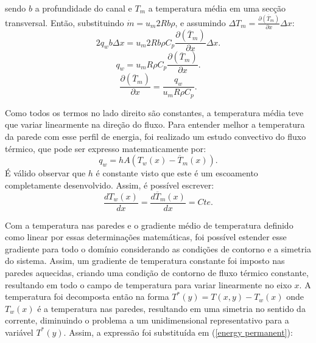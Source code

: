 sendo $b$ a profundidade do canal e $T_m$ a temperatura média em uma secção transversal. Então, substituindo $ \dot{m} = u_m 2R b \rho $, e assumindo $ \Delta T_m = \frac{\partial{\left(\overline{T}_m\right)}}{\partial{x}} \Delta x $:
\begin{equation}
2q_w b \Delta x = u_m 2R b \rho  C_p \frac{\partial{\left(\overline{T}_m\right)}}{\partial{x}} \Delta x.
\end{equation}     
\begin{equation}
q_w = u_m R \rho  C_p \frac{\partial{\left(\overline{T}_m\right)}}{\partial{x}} .
\end{equation} 
\begin{equation}\label{c_h_ee}
\frac{\partial{\left(\overline{T}_m\right)}}{\partial{x}} = \frac{q_w}{u_m  R \rho  C_p } .
\end{equation} 

Como todos os termos no lado direito são constantes, a temperatura média teve que variar linearmente na direção do fluxo.
Para entender melhor a temperatura da parede com esse perfil de energia, foi realizado um estudo convectivo do fluxo térmico, que pode ser expresso matematicamente por:
\begin{equation}
q_w = h A \left( T_w(x) - \overline{T}_m(x)\right).
\end{equation}
É válido observar que $h$ é constante visto que este é um escoamento completamente desenvolvido. Assim, é possível escrever:
\begin{equation}
\frac{d T_w(x)}{d x} = \frac{d \overline{T}_m(x)}{d x} = Cte.
\end{equation}	

Com a temperatura nas paredes e o gradiente médio de temperatura definido como linear por essas determinações matemáticas, foi possível estender esse gradiente para todo o domínio considerando as condições de contorno e a simetria do sistema. Assim, um gradiente de temperatura constante foi imposto nas paredes aquecidas, criando uma condição de contorno de fluxo térmico constante, resultando em todo o campo de temperatura para variar linearmente no eixo $x$. A temperatura foi decomposta então na forma $ T^\ast(y) = T(x,y) - T_w(x) $ onde $T_w(x)$ é a temperatura nas paredes, resultando em uma simetria no sentido da corrente, diminuindo o problema a um unidimensional representativo para a variável $T^\ast(y)$. Assim, a expressão foi substituída em (\ref{energy permanent}):



